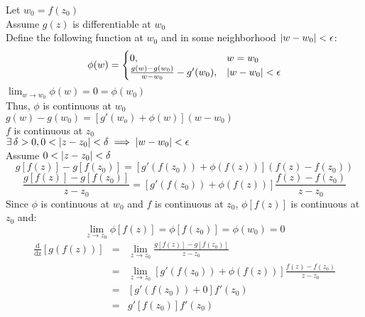 \documentclass[letterpaper,12pt,fleqn]{article}
\newcommand{\dz}[1]{\operatorname{\frac{d}{dz}}\left[#1\right]}
\newcommand{\e}{\epsilon}
\renewcommand{\d}{\delta}
\newcommand{\limz}{\lim_{z\to z_0}}
\newcommand{\limw}{\lim_{w\to w_0}}
\newcommand{\p}{\phi}
\begin{document}
\begin{theproof}
\begin{enumerate}
    Let $w_0=f(z_0)$ \\
    Assume $g(z)$ is differentiable at $w_0$ \\
    Define the following function at $w_0$ and in some neighborhood
    $\abs{w-w_0}<\e$:
    \[\p(w)=\begin{cases}
    0, & w=w_0 \\
    \frac{g(w)-g(w_0)}{w-w_0}-g'(w_0), & \abs{w-w_0}<\e \\
    \end{cases}\]
    $\limw{\p(w)}=0=\p(w_0)$ \\
    Thus, $\p$ is continuous at $w_0$ \\
    $g(w)-g(w_0)=[g'(w_o)+\p(w)](w-w_0)$ \\
    $f$ is continuous at $z_0$ \\
    $\exists\,\d>0,0<\abs{z-z_0}<\d\implies\abs{w-w_0}<\e$ \\
    \newpage
    Assume $0<\abs{z-z_0}<\d$ \\
    \[g[f(z)]-g[f(z_0)]=[g'(f(z_0))+\p(f(z))](f(z)-f(z_0))\]
    \[\frac{g[f(z)]-g[f(z_0)]}{z-z_0}=[g'(f(z_0))+\p(f(z))]
    \frac{f(z)-f(z_0)}{z-z_0}\]
    Since $\p$ is continuous at $w_0$ and $f$ is continuous at $z_0$,
    $\p[f(z)]$ is continuous at $z_0$ and:
    \[\limz{\p[f(z)]}=\p[f(z_0)]=\p(w_0)=0\]
    \begin{eqnarray*}
      \dz{g(f(z))} &=& \limz{\frac{g[f(z)]-g[f(z_0)]}{z-z_0}} \\
      &=& \limz{[g'(f(z_0))+\p(f(z))]\frac{f(z)-f(z_0)}{z-z_0}} \\
      &=& [g'(f(z_0))+0]f'(z_0) \\
      &=& g'[f(z_0)]f'(z_0) \\
    \end{eqnarray*}
  \end{enumerate}
\end{theproof}
\end{document}
